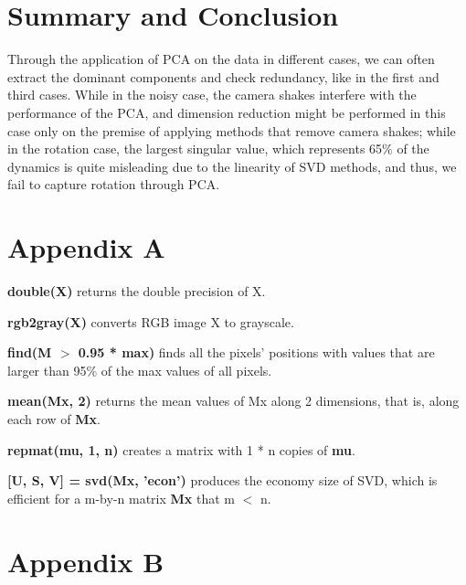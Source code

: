 \documentclass[10pt]{article}
\begin{document}
\section{Summary and Conclusion}
Through the application of PCA on the data in different cases, we can often extract the dominant components and check redundancy, like in the first and third cases. While in the noisy case, the camera shakes interfere with the performance of the PCA, and dimension reduction might be performed in this case only on the premise of applying methods that remove camera shakes; while in the rotation case, the largest singular value, which represents 65$\%$ of the dynamics is quite misleading due to the linearity of SVD methods, and thus, we fail to capture rotation through PCA.

\section{Appendix A}
\noindent
\textbf{double(X)} returns the double precision of X. 
\par
\vskip 0.2cm
\noindent
\textbf{rgb2gray(X)} converts RGB image X to grayscale.
\par
\vskip 0.2cm
\noindent
\textbf{find(M $>$ 0.95 * max)} finds all the pixels' positions with values that are larger than 95$\%$ of the max values of all pixels. 
\par
\vskip 0.2cm
\noindent
\textbf{mean(Mx, 2)} returns the mean values of Mx along 2 dimensions, that is, along each row of \textbf{Mx}.
\par
\vskip 0.2cm
\noindent
\textbf{repmat(mu, 1, n)} creates a matrix with 1 * n copies of \textbf{mu}.
\par
\vskip 0.2cm
\noindent
\textbf{[U, S, V] = svd(Mx, 'econ')} produces the economy size of SVD, which is efficient for a m-by-n matrix \textbf{Mx} that m $<$ n.

\newpage

\section{Appendix B}

\end{document}
